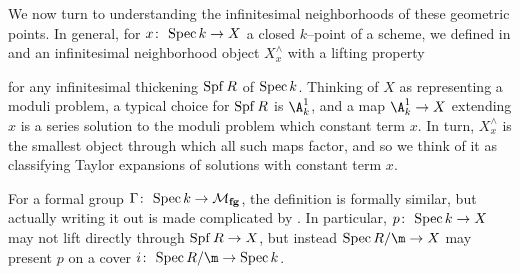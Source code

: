 We now turn to understanding the infinitesimal neighborhoods of these geometric points.  In general, for \(x\colon\thinspace \operatorname{Spec} k \to X\) a closed \(k\)--point of a scheme, we defined in  and  an infinitesimal neighborhood object \(X^\wedge_x\) with a lifting property
\begin{center}
\end{center}
for any infinitesimal thickening \(\operatorname{Spf} R\) of \(\operatorname{Spec} k\).  Thinking of \(X\) as representing a moduli problem, a typical choice for \(\operatorname{Spf} R\) is \(\A^1_k\), and a map \(\A^1_k \to X\) extending \(x\) is a series solution to the moduli problem which constant term \(x\).  In turn, \(X^\wedge_x\) is the smallest object through which all such maps factor, and so we think of it as classifying Taylor expansions of solutions with constant term \(x\).

For a formal group \(\Gamma\colon\thinspace \operatorname{Spec} k \to \mathcal{M}_{\mathbf{fg}}\), the definition is formally similar, but actually writing it out is made complicated by .  In particular, \(p\colon\thinspace \operatorname{Spec} k \to X\) may not lift directly through \(\operatorname{Spf} R \to X\), but instead \(\Spec R/\m \to X\) may present \(p\) on a cover \(i\co \Spec R/\m \to \Spec k\).

